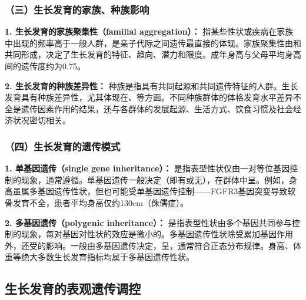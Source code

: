 \subsubsection{（三）生长发育的家族、种族影响}

\begin{keybox}
\textbf{1. 生长发育的家族聚集性（familial aggregation）：}
指某些性状或疾病在家族中出现的频率高于一般人群，是亲子代际之间遗传最直接的体现。家族聚集性由和共同形成，决定了生长发育的特征、趋向、潜力和限度。成年身高与父母平均身高间的遗传度约为0.75。

\textbf{2. 生长发育的种族差异性：}
种族是指具有共同起源和共同遗传特征的人群。生长发育具有种族差异性，尤其体现在、等方面。不同种族群体的体格发育水平差异不全是遗传因素作用的结果，还与各群体的发展起源、生活方式、饮食习惯及社会经济状况密切相关。
\end{keybox}

\subsubsection{（四）生长发育的遗传模式}

\begin{keybox}
\textbf{1. 单基因遗传（single gene inheritance）：}
是指表型性状仅由一对等位基因控制的现象，通常遵循。单基因遗传一般决定（即有或无），在群体中呈。例如，身高虽属多基因遗传性状，但也可能受单基因遗传控制——FGFR3基因突变导致软骨发育不全，患者平均身高仅约130cm（侏儒症）。

\textbf{2. 多基因遗传（polygenic inheritance）：}
是指表型性状由多个基因共同参与控制的现象，每对基因对性状的效应是微小的。多基因遗传性状除受累加基因作用外，还受的影响。一般由多基因遗传决定，呈，通常符合正态分布规律。身高、体重等绝大多数生长发育指标均属于多基因遗传性状。
\end{keybox}

\subsection{生长发育的表观遗传调控}


